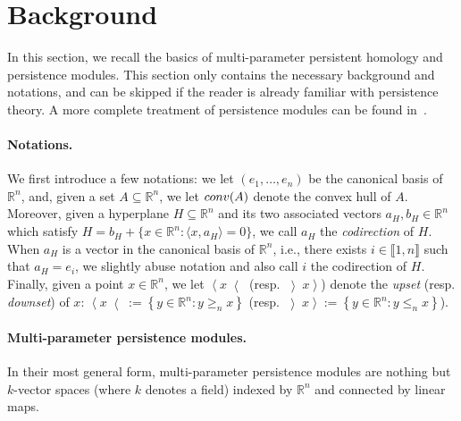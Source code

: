 \documentclass{article}
\newcommand{\field}{k}
\newcommand{\conv}[1]{ {\rm conv}(#1) }
\newcommand{\R}{\mathbb{R}}
\newcommand{\leqn}{\leq_n}
\newcommand{\geqn}{\geq_n}
\newcommand{\rebuttal}[1]{{ #1}}
\begin{document}
\section{Background}
\label{sec:background}

In this section, we recall the basics of %
multi-parameter persistent homology and persistence modules.
This section only contains the necessary background and
notations, and can be skipped if the reader is already familiar with persistence theory. A more complete treatment of persistence modules
can be found in~\cite{Chazal2016, deyComputationalTopologyData2022, oudotPersistenceTheoryQuiver2015, botnanIntroductionMultiparameterPersistence2023}.


\paragraph*{Notations.}
We first introduce a few notations: we let $(e_1,\dots,e_n)$ be the canonical basis of $\R^n$,
and,
given a set $A\subseteq \R^n$,
we let $\conv{A}$ denote the
convex hull of $A$. Moreover, given a hyperplane $H\subseteq \R^n$ and its two associated
vectors $a_H,b_H\in\R^n$ which satisfy $H=b_H+\{x\in\R^n: \langle x,a_H \rangle=0\}$,
we call $a_H$ the {\em codirection} of $H$.
When $a_H$ is a vector in the canonical basis of $\R^n$, i.e., there exists $i\in \llbracket 1,n\rrbracket$ such that
$a_H=e_i$, we slightly abuse notation and also call $i$ the codirection of $H$.
\rebuttal{Finally, given a point $x\in \R^n$, we let $\left< x \right<$ (resp.
	$\left> x \right>$) denote the {\em upset} (resp. {\em downset}) of $x$:
$\left< x \right< := \left\{ y \in\R^n: y\geqn x \right\}$ (resp. $\left> x \right> := \left\{ y \in\R^n: y \leqn x \right\}$). }

\paragraph*{Multi-parameter persistence modules.}
In their most general form, multi-parameter persistence modules \cite{carlssonTheoryMultidimensionalPersistence2009} are nothing but
$\field$-vector spaces (where $\field$ denotes a field) indexed by $\R^n$ and
connected by linear maps.\\
\end{document}
